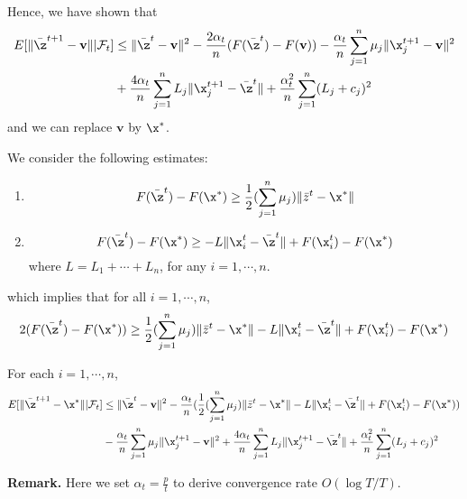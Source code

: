 \documentclass[a4paper,11pt]{article}
\begin{document}
Hence, we have shown that 
\begin{align*}
    E[\|\Bar{\z}^{t+1}-\mathbf{v} \| | \mathcal{F}_t ] & \leq \|\Bar{\z}^t-\mathbf{v} \|^2 - \frac{2\alpha_t}{n} (F(\Bar{\z}^t)-F(\mathbf{v})) - \frac{\alpha_t}{n}\sum_{j=1}^n \mu_j \|\x_j^{t+1}-\mathbf{v} \|^2 \\
    & + \frac{4\alpha_t}{n}\sum_{j=1}^n L_j\|\x_j^{t+1}-\Bar{\z}^{t} \| + \frac{\alpha_t^2}{n}\sum_{j=1}^n (L_j+c_j)^2
\end{align*}
and we can replace $\mathbf{v}$ by $\x^*$.

We consider the following estimates:
\begin{enumerate}[(1)]
    \item 
    \begin{equation}
        F(\Bar{\z}^t)-F(\x^*) \geq \frac{1}{2}(\sum_{j=1}^n \mu_j) \|\Bar{z}^t-\x^* \|
    \end{equation}
    \item 
    \begin{equation}
        F(\Bar{\z}^t)-F(\x^*) \geq -L\|\x_i^t -\Bar{\z}^t \| + F(\x_i^t)-F(\x^*)
    \end{equation}
    where $L=L_1+\cdots+L_n$, 
    for any $i = 1, \cdots, n$.
\end{enumerate}
which implies that for all $i = 1, \cdots, n$, 
\begin{equation}
    2(F(\Bar{\z}^t)-F(\x^*)) \geq \frac{1}{2}(\sum_{j=1}^n \mu_j) \|\Bar{z}^t-\x^* \| -L\|\x_i^t -\Bar{\z}^t \| + F(\x_i^t)-F(\x^*)
\end{equation}

For each $i = 1, \cdots, n$, 
\begin{align*}
    E[\|\Bar{\z}^{t+1}-\x^* \| | \mathcal{F}_t ] & \leq \|\Bar{\z}^t-\mathbf{v} \|^2 - \frac{\alpha_t}{n} (\frac{1}{2}(\sum_{j=1}^n \mu_j) \|\Bar{z}^t-\x^* \| -L\|\x_i^t -\Bar{\z}^t \| + F(\x_i^t)-F(\x^*)) \\ & - \frac{\alpha_t}{n}\sum_{j=1}^n \mu_j \|\x_j^{t+1}-\mathbf{v} \|^2 
     + \frac{4\alpha_t}{n}\sum_{j=1}^n L_j\|\x_j^{t+1}-\Bar{\z}^{t} \| + \frac{\alpha_t^2}{n}\sum_{j=1}^n (L_j+c_j)^2
\end{align*}

\textbf{Remark.} Here we set $\alpha_t=\frac{p}{t}$ to derive convergence rate $O(\log T / T)$.
\end{document}
